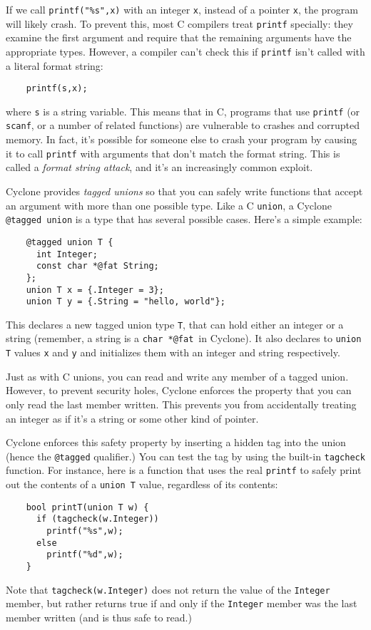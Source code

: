 If we call \texttt{printf("\%s",x)} with an integer \texttt{x},
instead of a pointer \texttt{x}, the program will likely crash.
To prevent this, most C compilers treat \texttt{printf} specially:
they examine the first argument and require that the remaining
arguments have the appropriate types.  However, a compiler can't check
this if \texttt{printf} isn't called with a literal format string:
\begin{verbatim}
    printf(s,x);
\end{verbatim}
where \texttt{s} is a string variable.  This means that in C, programs
that use \texttt{printf} (or \texttt{scanf}, or a number of related
functions) are vulnerable to crashes and corrupted memory.  In fact,
it's possible for someone else to crash your program by causing it to
call \texttt{printf} with arguments that don't match the format
string.  This is called a \emph{format string attack}, and it's an
increasingly common exploit.

Cyclone provides \emph{tagged unions} so that you can safely write
functions that accept an argument with more than one possible type.
Like a C \texttt{union}, a Cyclone \texttt{@tagged union} is a type that has
several possible cases.  Here's a simple example:
\begin{verbatim}
    @tagged union T {
      int Integer;
      const char *@fat String;
    };
    union T x = {.Integer = 3};
    union T y = {.String = "hello, world"};
\end{verbatim}
This declares a new tagged union type \texttt{T}, that can hold either an
integer or a string (remember, a string is a \texttt{char *@fat}\ in
Cyclone).  It also declares to \texttt{union T} values \texttt{x} and
\texttt{y} and initializes them with an integer and string respectively.

Just as with C unions, you can read and write any member of a tagged 
union.  However, to prevent security holes, Cyclone enforces the
property that you can only read the last member written.  This
prevents you from accidentally treating an integer as if it's
a string or some other kind of pointer.  

Cyclone enforces this safety property by inserting a hidden tag
into the union (hence the \texttt{@tagged} qualifier.)  
You can test the
tag by using the built-in \texttt{tagcheck} function.  For
instance, here is a function that uses the real \texttt{printf}
to safely print out the contents of a \texttt{union T} value,
regardless of its contents:
\begin{verbatim}
    bool printT(union T w) {
      if (tagcheck(w.Integer))
        printf("%s",w);
      else 
        printf("%d",w);
    }
\end{verbatim}
Note that \texttt{tagcheck(w.Integer)} does not return the
value of the \texttt{Integer} member, but rather returns true
if and only if the \texttt{Integer} member was the last member
written (and is thus safe to read.)  

